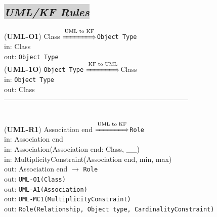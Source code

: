 \documentclass[sn-mathphys]{sn-jnl}
\begin{document}
\subsection{\colorbox{lightgray}{\em UML/KF Rules}}

({\bf UML-O1}) Class $\overset{\text{UML to KF}}{\xLongrightarrow{\hspace*{1.4cm}}}${\tt Object Type}\\
\hspace*{0.3cm}in: Class\\
\hspace*{0.5cm}out: {\tt Object Type}\\

({\bf UML-1O}) {\tt Object Type} $\overset{\text{KF to UML}}{\xLongrightarrow{\hspace*{1.4cm}}}${Class}\\
\hspace*{0.3cm}in: {\tt Object Type}\\
\hspace*{0.5cm}out: Class\\

------------------------------------------------------------------------------
\\ \

({\bf UML-R1}) Association end $\overset{\text{UML to KF}}{\xLongrightarrow{\hspace*{1.4cm}}}${\tt Role}\\
\hspace*{0.3cm}in: Association end\\
\hspace*{0.3cm}in: Association(Association end: Class, \_\_)\\
\hspace*{0.3cm}in: MultiplicityConstraint(Association end, min, max)\\
\hspace*{0.5cm}out: Association end $\rightarrow$ {\tt Role}\\
\hspace*{0.5cm}out: {\tt UML-O1(Class)}\\
\hspace*{0.5cm}out: {\tt UML-A1(Association)}\\
\hspace*{0.5cm}out: {\tt  UML-MC1(MultiplicityConstraint)}\\
\hspace*{0.5cm}out: {\tt Role(Relationship, Object type, CardinalityConstraint)}\\
\end{document}
